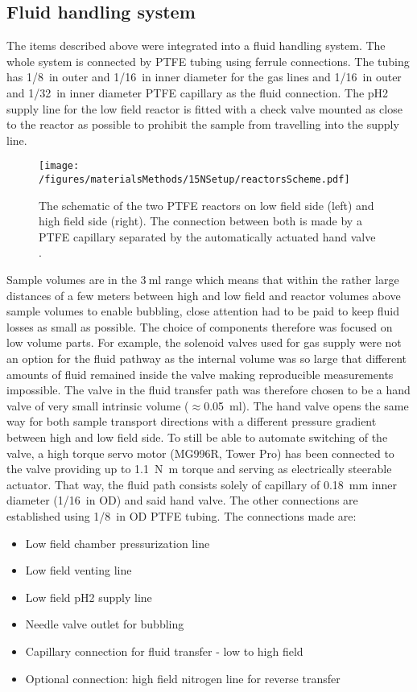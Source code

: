         \subsection{Fluid handling system}
        The items described above were integrated into a fluid handling system. The whole system is connected by PTFE tubing  using ferrule connections. The tubing has \SI{1/8}{in} outer and \SI{1/16}{in} inner diameter for the gas lines and \SI{1/16}{in} outer and \SI{1/32}{in} inner diameter PTFE capillary as the fluid connection. The pH2 supply line for the low field reactor is fitted with a check valve mounted as close to the reactor as possible to prohibit the sample from travelling into the supply line.
            \begin{figure}
                \label{figure:matMeth:shuttlingPathway}
                \texttt{[image: /figures/materialsMethods/15NSetup/reactorsScheme.pdf]}
                \caption[Reactor schematics]{The schematic of the two PTFE reactors on low field side (left) and high field side (right). The connection between both is made by a PTFE capillary separated by the automatically actuated hand valve . }
            \end{figure}
            Sample volumes are in the $\SI{3}{\milli\litre}$ range which means that within the rather large distances of a few meters between high and low field and reactor volumes above sample volumes to enable bubbling, close attention had to be paid to keep fluid losses as small as possible.  The choice of components therefore was focused on low volume parts.  For example, the solenoid valves used for gas supply were not an option for the fluid pathway as the internal volume was so large that different amounts of fluid remained inside the valve making reproducible measurements impossible.  The valve in the fluid transfer path was therefore chosen to be a hand valve of very small intrinsic volume ($\approx$\SI{0.05}{\ml}). The hand valve opens the same way for both sample transport directions with a different pressure gradient between high and low field side. To still be able to automate switching of the valve, a high torque servo motor (MG996R, Tower Pro) has been connected to the valve providing up to \SI{1.1}{\newton\m} torque and serving as electrically steerable actuator. That way, the fluid path consists solely of capillary of \SI{0.18}{\mm} inner diameter (\SI{1/16}{in} OD) and said hand valve. The other connections are established using \SI{1/8}{in} OD PTFE tubing.  The connections made are:
            \begin{itemize}
                \setlength{\itemsep}{-2pt}
                \item Low field chamber pressurization line
                \item Low field venting line
                \item Low field pH2 supply line
                \item Needle valve outlet for bubbling
                \item Capillary connection for fluid transfer - low to high field
                \item Optional connection: high field nitrogen line for reverse transfer
            \end{itemize}
